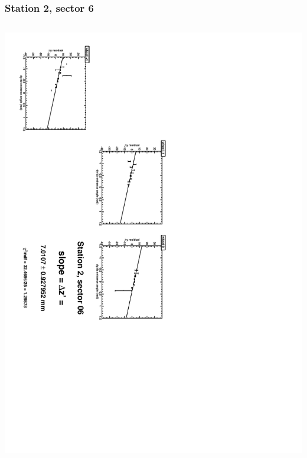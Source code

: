 \documentclass[compress]{beamer}
\begin{document}
\begin{frame}
\frametitle{Station 2, sector 6}
\begin{columns}
\includegraphics[height=\linewidth, angle=90]{zfits/zfit_2_06.pdf}


\end{columns}
\end{frame}
\end{document}
